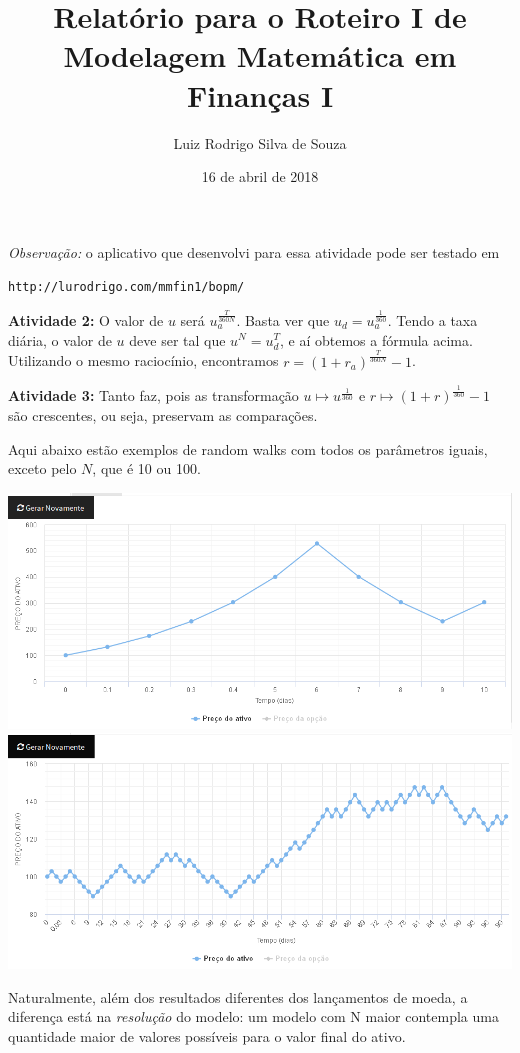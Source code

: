 \documentclass[]{article}
\title{Relatório para o Roteiro I de Modelagem Matemática em Finanças I}
\author{Luiz Rodrigo Silva de Souza}
\date{16 de abril de 2018}
\begin{document}
\maketitle

\emph{Observação:} o aplicativo que desenvolvi para essa atividade pode
ser testado em

\texttt{http://lurodrigo.com/mmfin1/bopm/}

\textbf{Atividade 2:} O valor de \(u\) será \(u_a^{\frac{T}{360N}}\).
Basta ver que \(u_d = u_a^{\frac{1}{360}}\). Tendo a taxa diária, o
valor de \(u\) deve ser tal que \(u^N = u_d^T\), e aí obtemos a fórmula
acima. Utilizando o mesmo raciocínio, encontramos
\(r = (1+r_a)^{\frac{T}{360N}} - 1\).

\textbf{Atividade 3:} Tanto faz, pois as transformação
\(u \mapsto u^{\frac{1}{360}}\) e
\(r \mapsto (1 + r)^{\frac{1}{360}} - 1\) são crescentes, ou seja,
preservam as comparações.

Aqui abaixo estão exemplos de random walks com todos os parâmetros
iguais, exceto pelo \(N\), que é 10 ou 100.

\includegraphics{grafico1.png} \includegraphics{grafico2.png}

Naturalmente, além dos resultados diferentes dos lançamentos de moeda, a
diferença está na \emph{resolução} do modelo: um modelo com N maior
contempla uma quantidade maior de valores possíveis para o valor final
do ativo.
\end{document}
